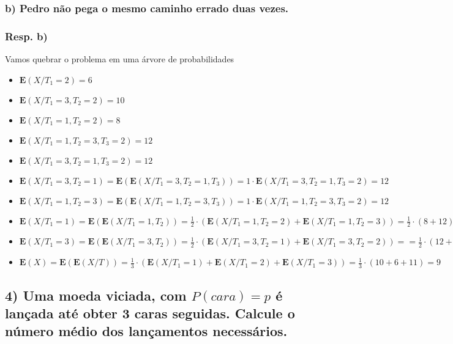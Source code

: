 \documentclass[portuguese]{article}
\begin{document}
\subsubsection*{\textmd{b) Pedro não pega o mesmo caminho errado duas vezes.}}


\subsubsection*{\textmd{Resp}. \textmd{b)}}

Vamos quebrar o problema em uma árvore de probabilidades
\begin{itemize}
\item $\mathbf{E}(X/T_{1}=2)=6$
\item $\mathbf{E}(X/T_{1}=3,T_{2}=2)=10$
\item $\mathbf{E}(X/T_{1}=1,T_{2}=2)=8$
\item $\mathbf{E}(X/T_{1}=1,T_{2}=3,T_{3}=2)=12$
\item $\mathbf{E}(X/T_{1}=3,T_{2}=1,T_{3}=2)=12$
\item $\mathbf{E}(X/T_{1}=3,T_{2}=1)=\mathbf{E}(\mathbf{E}(X/T_{1}=3,T_{2}=1,T_{3}))=1\cdot\mathbf{E}(X/T_{1}=3,T_{2}=1,T_{3}=2)=12$
\item $\mathbf{E}(X/T_{1}=1,T_{2}=3)=\mathbf{E}(\mathbf{E}(X/T_{1}=1,T_{2}=3,T_{3}))=1\cdot\mathbf{E}(X/T_{1}=1,T_{2}=3,T_{3}=2)=12$
\item $\mathbf{E}(X/T_{1}=1)=\mathbf{E}(\mathbf{E}(X/T_{1}=1,T_{2}))=\frac{1}{2}\cdot(\mathbf{E}(X/T_{1}=1,T_{2}=2)+\mathbf{E}(X/T_{1}=1,T_{2}=3))=\frac{1}{2}\cdot(8+12)=10$
\item $\mathbf{E}(X/T_{1}=3)=\mathbf{E}(\mathbf{E}(X/T_{1}=3,T_{2}))=\frac{1}{2}\cdot(\mathbf{E}(X/T_{1}=3,T_{2}=1)+\mathbf{E}(X/T_{1}=3,T_{2}=2))==\frac{1}{2}\cdot(12+10)=11$
\item $\mathbf{E}(X)=\mathbf{E}(\mathbf{E}(X/T))=\frac{1}{3}\cdot(\mathbf{E}(X/T_{1}=1)+\mathbf{E}(X/T_{1}=2)+\mathbf{E}(X/T_{1}=3))=\frac{1}{3}\cdot(10+6+11)=9$
\end{itemize}

\subsection*{\textcompwordmark{}}


\subsection*{\textmd{4) Uma moeda viciada, com $P(cara)=p$ é lançada até obter
3 caras seguidas. Calcule o número médio dos lançamentos necessários.}}
\end{document}

